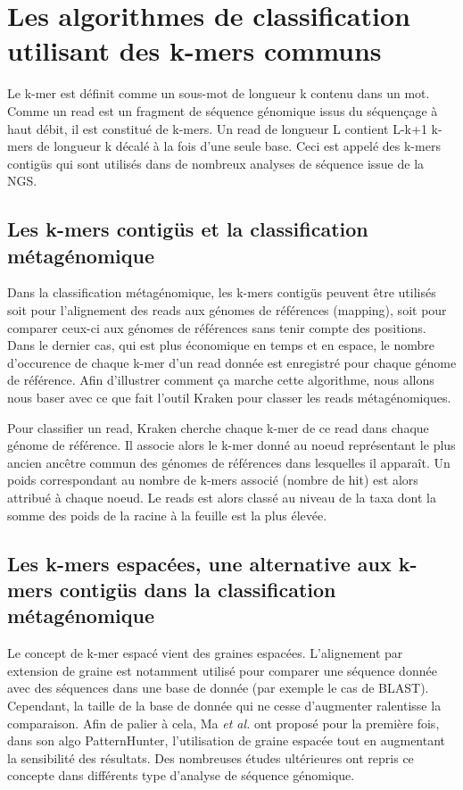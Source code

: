 \section{Les algorithmes de classification utilisant des k-mers communs}

Le k-mer est définit comme un sous-mot de longueur k contenu dans un mot.
Comme un read est un fragment de séquence génomique issus du séquençage à haut débit, il est constitué de k-mers. 
Un read de longueur L contient L-k+1 k-mers de longueur k décalé à la fois d'une seule base.
Ceci est appelé des k-mers contigüs qui sont utilisés dans de nombreux analyses de séquence issue de la NGS. 


\subsection{Les k-mers contigüs et la classification métagénomique}

Dans la classification métagénomique, les k-mers contigüs peuvent être utilisés soit pour l'alignement des reads aux génomes de références (mapping), soit pour comparer ceux-ci aux génomes de références sans tenir compte des positions. 
Dans le dernier cas, qui est plus économique en temps et en espace, le nombre d'occurence de chaque k-mer d'un read donnée est enregistré pour chaque génome de référence.
Afin d'illustrer comment ça marche cette algorithme, nous allons nous baser avec ce que fait l'outil Kraken pour classer les reads métagénomiques.

Pour classifier un read, Kraken \cite{Wood2014} cherche chaque k-mer de ce read dans chaque génome de référence. Il associe alors le k-mer donné au noeud représentant le plus ancien ancêtre commun des génomes de références dans lesquelles il apparaît. Un poids correspondant au nombre de k-mers associé (nombre de hit) est alors attribué à chaque noeud. Le reads est alors classé au niveau de la taxa dont la somme des poids de la racine à la feuille est la plus élevée.


\subsection{Les k-mers espacées, une alternative aux k-mers contigüs dans la classification métagénomique}
                  
Le concept de k-mer espacé vient des graines espacées. 
L'alignement par extension de graine est notamment utilisé pour comparer une séquence donnée avec des séquences dans une base de donnée (par exemple le cas de BLAST). 
Cependant, la taille de la base de donnée qui ne cesse d'augmenter ralentisse la comparaison.
Afin de palier à cela, Ma \textit{et al.}\cite{Ma2002} ont proposé pour la première fois, dans son algo PatternHunter, l'utilisation de graine espacée tout en augmentant la sensibilité des résultats. Des nombreuses études ultérieures ont repris ce concepte dans différents type d'analyse de séquence génomique.

